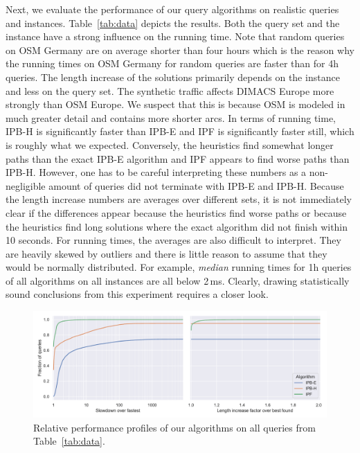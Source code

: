 \documentclass[a4paper,UKenglish,cleveref, autoref, thm-restate]{lipics-v2021}
\begin{document}
Next, we evaluate the performance of our query algorithms on realistic queries and instances.
Table~\ref{tab:data} depicts the results.
Both the query set and the instance have a strong influence on the running time.
Note that random queries on OSM Germany are on average shorter than four hours which is the reason why the running times on OSM Germany for random queries are faster than for 4h queries.
The length increase of the solutions primarily depends on the instance and less on the query set.
The synthetic traffic affects DIMACS Europe more strongly than OSM Europe.
We suspect that this is because OSM is modeled in much greater detail and contains more shorter arcs. %
In terms of running time, IPB-H is significantly faster than IPB-E and IPF is significantly faster still, which is roughly what we expected.
Conversely, the heuristics find somewhat longer paths than the exact IPB-E algorithm and IPF appears to find worse paths than IPB-H.
However, one has to be careful interpreting these numbers as a non-negligible amount of queries did not terminate with IPB-E and IPB-H.
Because the length increase numbers are averages over different sets, it is not immediately clear if the differences appear because the heuristics find worse paths or because the heuristics find long solutions where the exact algorithm did not finish within 10 seconds.
For running times, the averages are also difficult to interpret.
They are heavily skewed by outliers and there is little reason to assume that they would be normally distributed.
For example, \emph{median} running times for 1h queries of all algorithms on all instances are all below 2\,ms. %
Clearly, drawing statistically sound conclusions from this experiment requires a closer look.

\begin{figure}
\centering
\includegraphics[width=\linewidth]{fig/combined_perf_profile.pdf}
\caption{
Relative performance profiles of our algorithms on all queries from Table~\ref{tab:data}.
}\label{fig:perf_profile}
\end{figure}
\end{document}
